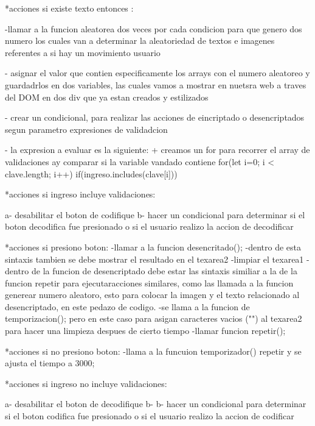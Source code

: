      *acciones si existe texto entonces :

        -llamar a la funcion aleatorea dos veces por cada condicion para que genero dos numero los cuales van a determinar la aleatoriedad de textos e imagenes referentes a si hay un movimiento usuario 

        - asignar el valor que contien especificamente los arrays con el numero aleatoreo y guardadrlos en dos variables, las cuales vamos a mostrar en nuetsra 
        web a traves del DOM en dos div que ya estan creados y estilizados

        - crear un condicional, para realizar las acciones de eincriptado o desencriptados segun parametro expresiones de validadcion

        - la expresion a evaluar es la siguiente:
            + creamos un for para recorrer el array de validaciones ay comparar si la variable vandado contiene 
           for(let i=0; i < clave.length; i++){
              if(ingreso.includes(clave[i])){ 
              }        
          }

          *acciones si ingreso incluye validaciones:
             
              a- desabilitar el boton de codifique
              b- hacer un condicional para determinar si el boton decodifica fue presionado o si el usuario realizo la accion de decodificar 

              *acciones si presiono boton:
                 -llamar a la funcion desencritado();
                 -dentro de esta sintaxis tambien se debe mostrar el resultado en el texarea2
                 -limpiar el texarea1
                 -dentro de la funcion de desencriptado debe estar las sintaxis similiar a la de la funcion repetir para ejecutaracciones similares, como las llamada a la funcion generear numero aleatoro, esto para colocar la imagen y el texto relacionado al desencriptado, en este pedazo de codigo.
                 -se llama a la  funcion de temporizacion(); pero en este caso para asigan caracteres vacios ("") al texarea2 para hacer una limpieza despues de cierto tiempo
                 -llamar funcion repetir();
              
              *acciones si no presiono boton:
                -llama a la funcuion temporizador() repetir y se ajusta el tiempo a 3000;
          
         *acciones si ingreso no incluye validaciones:

              a- desabilitar el boton de decodifique
              b- b- hacer un condicional para determinar si el boton codifica fue presionado o si el usuario realizo la accion de codificar 

